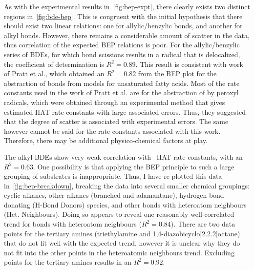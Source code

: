\begin{doublespace}
As with the experimental results in~\ref{fig:bep-expt}, there clearly exists two
distinct regions in~\ref{fig:bde-bep}. This is congruent with the initial
hypothesis that there should exist two linear relations: one for
allylic/benzylic  bonds, and another for alkyl  bonds. However,
there remains a considerable amount of scatter in the data, thus correlation of
the expected BEP relations is poor. For the allylic/benzylic series of 
BDEs, for which bond scissions results in a radical that is delocalized, the
coefficient of determination is $R^2 = 0.89$. This result is consistent with
work of Pratt et al.\cite{Pratt2003}, which obtained an $R^2 = 0.82$ from the
BEP plot for the abstraction of  bonds from models for unsaturated fatty
acids. Most of the rate constants used in the work of Pratt et al. are for the
abstraction of  by peroxyl radicals, which were obtained through an
experimental method that gives estimated HAT rate constants with large
associated errors. Thus, they suggested that the degree of scatter is associated
with experimental errors. The same however cannot be said for the rate constants
associated with this work. Therefore, there may be additional physico-chemical
factors at play.

The alkyl  BDEs show very weak correlation with \cumo\ HAT rate
constants, with an $R^2 =0.63$. One possibility is that applying the BEP
principle to such a large grouping of substrates is inappropriate. Thus, I have
re-plotted this data in~\ref{fig:bep-breakdown}, breaking the data into several
smaller chemical groupings: cyclic alkanes, other alkanes (branched and
adamantane), hydrogen bond donating (H-Bond Donors) species, and other 
bonds with heteroatom neighbours (Het. Neighbours). Doing so appears to reveal
one reasonably well-correlated trend for  bonds with heteroatom
neighbours ($R^2 = 0.84$). There are two data points for the tertiary amines
(triethylamine and 1,4-diazobicyclo[2.2.2]octane) that do not fit well with the
expected trend, however it is unclear why they do not fit into the other points
in the heteroatomic neighbours trend. Excluding points for the tertiary amines
results in an $R^2 = 0.92$.


\end{doublespace}
